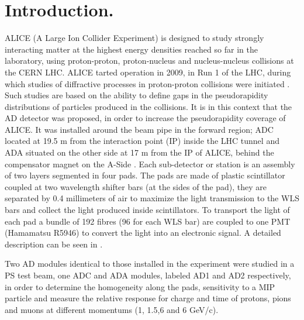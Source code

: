 \section{Introduction.}

ALICE (A Large Ion Collider Experiment) \cite{AlicePerformance} is designed to study strongly interacting matter
at the highest energy densities reached so far in the laboratory, using proton-proton, proton-nucleus and 
nucleus-nucleus collisions at the CERN LHC. ALICE tarted operation in 2009, in Run 1 of the LHC, during which studies of diffractive processes in proton-proton collisions were initiated \cite{Villalobos, Evdokimov}. Such studies are based on the ability to define gaps in the pseudorapidity distributions of particles produced in the collisions. 
It is in this context that the AD detector was proposed, in order to increase the pseudorapidity coverage of 
ALICE. 
It was installed around the beam pipe in the forward region; ADC located at 19.5 m from the interaction point (IP) inside the LHC tunnel and ADA situated on the other side at 17 m from the IP of ALICE, behind the compensator magnet on the A-Side \cite{ADNote, AD-Villatoro}.
% 
Each sub-detector or station is an assembly of two layers segmented in four pads. 
The pads are made of plastic scintillator coupled at %
two wavelength shifter bars (at the sides of the pad), they are separated by 0.4 millimeters of air to maximize 
the light transmission to the WLS bars and collect the light produced inside scintillators.
%
To transport the light of each pad a bundle of 192 fibres (96 for each WLS bar) are coupled to one PMT (Hamamatsu R5946) to convert the light into an electronic signal. A detailed description can be seen in \cite{ADNote}.

Two AD modules identical to those installed in the experiment were studied in a PS test beam, one ADC and  ADA 
modules, labeled AD1 and AD2 respectively, in order to determine the homogeneity along the pads, sensitivity to a
MIP particle and measure the relative response for charge and time of protons, pions and muons at different 
momentums (1, 1.5,6 and 6 GeV/c). 

